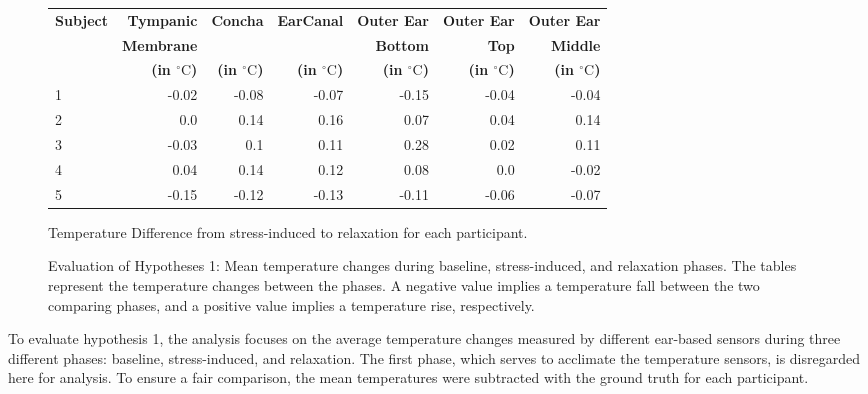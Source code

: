 \begin{figure}[t]
    \begin{subtable}{\textwidth}
        \centering
        \begin{tabular}{|l|rrrrrr|}
        \hline
        \textbf{Subject} & \textbf{Tympanic} & \textbf{Concha} & \textbf{EarCanal} & \textbf{Outer Ear} & \textbf{Outer Ear} & \textbf{Outer Ear} \\
             & \textbf{Membrane} &  &  & \textbf{Bottom} & \textbf{Top} & \textbf{Middle} \\   
             &\textbf{(in \(^\circ\text{C}\))} & \textbf{(in \(^\circ\text{C}\))} & \textbf{(in \(^\circ\text{C}\))} & \textbf{(in \(^\circ\text{C}\))} & \textbf{(in \(^\circ\text{C}\))} & \textbf{(in \(^\circ\text{C}\))} \\
        \hline
        1 & -0.02 & -0.08 & -0.07 & -0.15 & -0.04 & -0.04 \\
        2 & 0.0 & 0.14 & 0.16 & 0.07 & 0.04 & 0.14 \\
        3 & -0.03 & 0.1 & 0.11 & 0.28 & 0.02 & 0.11 \\
        4 & 0.04 & 0.14 & 0.12 & 0.08 & 0.0 & -0.02 \\
        5 & -0.15 & -0.12 & -0.13 & -0.11 & -0.06 & -0.07 \\
        \hline
        \end{tabular}
        \caption{Temperature Difference from stress-induced to relaxation for each participant.}
        \label{subsec:Evaluation:Study2:Hypothesis1:temp_diff_stress_to_relax_all}
    \end{subtable} 
    \caption{Evaluation of Hypotheses 1: Mean temperature changes during baseline, stress-induced, and relaxation phases. The tables represent the temperature changes between the phases. A negative value implies a temperature fall between the two comparing phases, and a positive value implies a temperature rise, respectively.}
    \label{sec:Evaluation:Study2:Hypothesis1:Summary}
\end{figure}

To evaluate hypothesis 1, the analysis focuses on the average temperature changes measured by different ear-based sensors during three different phases: baseline, stress-induced, and relaxation. 
The first phase, which serves to acclimate the temperature sensors, is disregarded here for analysis.
To ensure a fair comparison, the mean temperatures were subtracted with the ground truth for each participant.

